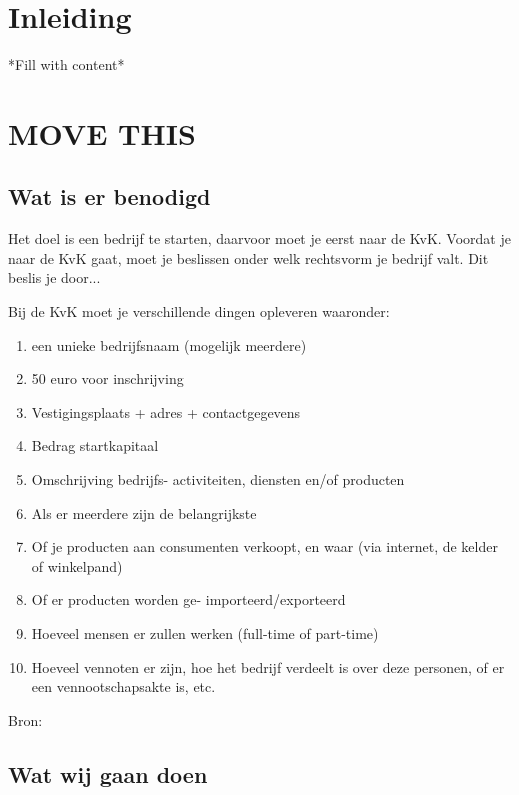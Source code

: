 \documentclass[11pt,oneside,a4paper,numbers=enddot]{report} %
\begin{document}
\Pre

\chapter{Inleiding}
*Fill with content*






\chapter{MOVE THIS}
\section{Wat is er benodigd}

Het doel is een bedrijf te starten, daarvoor moet je eerst naar de KvK.
Voordat je naar de KvK gaat, moet je beslissen onder welk rechtsvorm je bedrijf valt.
Dit beslis je door... 

Bij de KvK moet je verschillende dingen opleveren waaronder:

\begin{enumerate}

\item
  een unieke bedrijfsnaam (mogelijk meerdere)
\item
  50 euro voor inschrijving
\item
  Vestigingsplaats
  + adres
  + contactgegevens
\item
  Bedrag startkapitaal
\item
  Omschrijving bedrijfs- activiteiten,
  diensten en/of
  producten
\item
  Als er meerdere zijn de belangrijkste
\item
  Of je producten aan consumenten verkoopt,
  en waar
  (via internet,
  de kelder of winkelpand)
\item
  Of er producten worden ge- importeerd/exporteerd
\item
  Hoeveel mensen er zullen werken
  (full-time of part-time)
\item
  Hoeveel vennoten er zijn,
  hoe het bedrijf verdeelt is over deze personen,
  of er een vennootschapsakte is,
  etc.
  
\end{enumerate}

Bron: \cite{kvk}

\section{Wat wij gaan doen}
\end{document}
